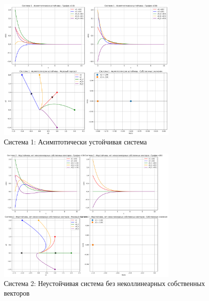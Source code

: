 \begin{figure}[h!]
\centering
\includegraphics[width=0.8\textwidth]{images/task1/система_1_-_асимптотически_устойчива.png}
\caption{Система 1: Асимптотически устойчивая система}
\label{fig:system1}
\end{figure}

\begin{figure}[h!]
\centering
\includegraphics[width=0.8\textwidth]{images/task1/система_2_-_неустойчива,_нет_неколлинеарных_собственных_векторов.png}
\caption{Система 2: Неустойчивая система без неколлинеарных собственных векторов}
\label{fig:system2}
\end{figure}

